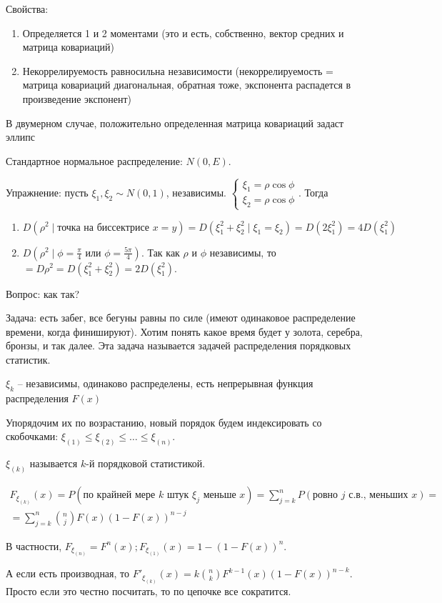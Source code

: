 Свойства:
\begin{enumerate}
\item Определяется 1 и 2 моментами (это и есть, собственно, вектор средних и матрица ковариаций)
\item Некоррелируемость равносильна независимости (некоррелируемость = матрица ковариаций диагональная, обратная тоже, экспонента распадется в произведение экспонент)
\end{enumerate}
\begin{exmp}
В двумерном случае, положительно определенная матрица ковариаций задаст эллипс
\end{exmp}
Стандартное нормальное распределение: $N(0, E)$.

Упражнение: пусть $\xi_1, \xi_2 \sim N(0, 1)$, независимы.
$\begin{cases} \xi_1 = \rho \cos \phi \\ \xi_2 = \rho \cos \phi \end{cases}$.
Тогда   
\begin{enumerate}
\item $D(\rho^2 \mid \text{точка на биссектрисе } x = y) = D(\xi_1^2 + \xi_2^2 \mid \xi_1 = \xi_2) = D(2\xi_1^2) = 4 D(\xi_1^2)$
\item $D(\rho^2 \mid \phi = \frac{\pi}{4} \text{ или } \phi = \frac{5\pi}{4})$.
Так как $\rho$ и $\phi$ независимы, то $ = D\rho^2 = D(\xi_1^2 + \xi_2^2) = 2D(\xi_1^2)$.
\end{enumerate}
Вопрос: как так?

Задача: есть забег, все бегуны равны по силе (имеют одинаковое распределение времени, когда финишируют).
Хотим понять какое время будет у золота, серебра, бронзы, и так далее. Эта задача называется задачей распределения порядковых статистик.

$\xi_k$ -- независимы, одинаково распределены, есть непрерывная функция распределения $F(x)$    

Упорядочим их по возрастанию, новый порядок будем индексировать со скобочками: $\xi_{(1)} \leq \xi_{(2)} \leq \dots \leq \xi_{(n)}$.

$\xi_{(k)}$ называется $k$-й порядковой статистикой.

\begin{gather*}
F_{\xi_{(k)}}(x) = P(\text{по крайней мере } k \text{ штук } \xi_j \text{ меньше } x) = \sum\limits_{j=k}^n P(\text{ровно } j \text{ с.в., меньших } x) = \\
= \sum\limits_{j=k}^n {n \choose j} F(x) (1 - F(x))^{n-j}
\end{gather*}

В частности, $F_{\xi_{(n)}} = F^n(x); F_{\xi_{(1)}} (x) = 1 - (1 - F(x))^n$.

А если есть производная, то $F'_{\xi_{(k)}}(x) = k {n \choose k} F^{k-1}(x)(1 - F(x))^{n-k}$. Просто если это честно посчитать, то по цепочке все сократится.